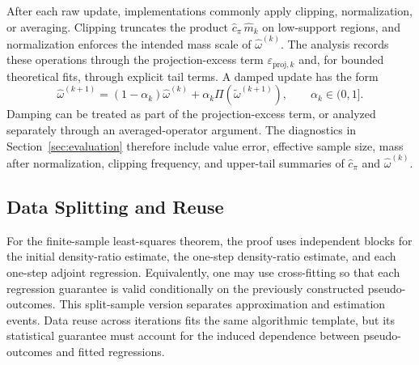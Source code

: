 \documentclass{article}
\newcommand{\mhat}{\widehat m}
\newcommand{\1}{\mathbf{1}}
\newcommand{\omegahat}{\widehat{\omega}}
\newcommand{\omegatilde}{\widetilde{\omega}}
\newcommand{\chat}{\widehat{c}_\pi}
\newcommand{\Proj}{\Pi}
\theoremstyle{plain}
\theoremstyle{definition}
\theoremstyle{remark}
\begin{document}
After each raw update, implementations commonly apply clipping, normalization, or averaging.
Clipping truncates the product $\chat\,\mhat_k$ on low-support regions, and normalization enforces the intended mass scale of $\omegahat^{(k)}$.
The analysis records these operations through the projection-excess term $\varepsilon_{\mathrm{proj},k}$ and, for bounded theoretical fits, through explicit tail terms.
A damped update has the form
\[
    \omegahat^{(k+1)}
    =
    (1-\alpha_k)\omegahat^{(k)}
    +
    \alpha_k\Proj(\omegatilde^{(k+1)}),
    \qquad \alpha_k\in(0,1].
\]
Damping can be treated as part of the projection-excess term, or analyzed separately through an averaged-operator argument.
The diagnostics in Section~\ref{sec:evaluation} therefore include value error, effective sample size, mass after normalization, clipping frequency, and upper-tail summaries of $\chat$ and $\omegahat^{(k)}$.

\subsection{Data Splitting and Reuse}
\label{sec:data-splitting-reuse}

For the finite-sample least-squares theorem, the proof uses independent blocks for the initial density-ratio estimate, the one-step density-ratio estimate, and each one-step adjoint regression.
Equivalently, one may use cross-fitting so that each regression guarantee is valid conditionally on the previously constructed pseudo-outcomes.
This split-sample version separates approximation and estimation events.
Data reuse across iterations fits the same algorithmic template, but its statistical guarantee must account for the induced dependence between pseudo-outcomes and fitted regressions.
\end{document}
